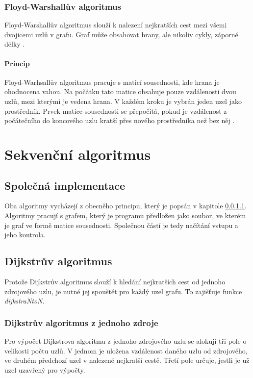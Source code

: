 \subsubsection{Floyd-Warshallův algoritmus}
Floyd-Warshallův algoritmus slouží k nalezení nejkratších cest mezi všemi dvojicemi uzlů v grafu. Graf může obsahovat hrany, ale nikoliv cykly, záporné délky \cite{w:fw:def}.

\paragraph{Princip} \label{l:fw:princip}
Floyd-Warhsallův algoritmus pracuje s maticí sousednosti, kde hrana je ohodnocena vahou. Na počátku tato matice obsahuje pouze vzdálenosti dvou uzlů, mezi kterými je vedena hrana. V každém kroku je vybrán jeden uzel jako prostředník. Prvek matice sousednosti se přepočítá, pokud je vzdálenost z počátečního do koncového uzlu kratší přes nového prostředníka než bez něj \cite{w:fw:def}.


\section{Sekvenční algoritmus}
\subsection{Společná implementace}
Oba algoritmy vycházejí z obecněho principu, který je popsán v kapitole \ref{l:fw:princip}. Algoritmy pracují s grafem, který je programu předložen jako soubor, ve kterém je graf ve formě matice sousednosti. Společnou částí je tedy načítání vstupu a jeho kontrola.

\subsection{Dijkstrův algoritmus}
Protože Dijkstrův algoritmus slouží k hledání nejkratších cest od jednoho zdrojového uzlu, je nutné jej spouštět pro každý uzel grafu. To zajišťuje funkce \textit{dijkstraNtoN}.

\subsubsection{Dijkstrův algoritmus z jednoho zdroje}
Pro výpočet Dijkstrova algoritmu z jednoho zdrojového uzlu se alokují tři pole o velikosti počtu uzlů. V jednom je uložena vzdálenost daného uzlu od zdrojového, ve druhém předchozí uzel v nalezené nejkratší cestě. Třetí pole určuje, jestli je už uzel uzavřený pro výpočty.

